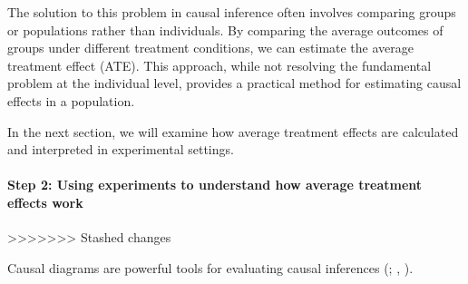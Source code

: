 \documentclass[
  singlecolumn]{article}
\let\oldparagraph\paragraph
\renewcommand{\paragraph}[1]{\oldparagraph{#1}\mbox{}}
\begin{document}
The solution to this problem in causal inference often involves
comparing groups or populations rather than individuals. By comparing
the average outcomes of groups under different treatment conditions, we
can estimate the average treatment effect (ATE). This approach, while
not resolving the fundamental problem at the individual level, provides
a practical method for estimating causal effects in a population.

In the next section, we will examine how average treatment effects are
calculated and interpreted in experimental settings.

\paragraph{Step 2: Using experiments to understand how average treatment
effects
work}\label{step-2-using-experiments-to-understand-how-average-treatment-effects-work}
>>>>>>> Stashed changes

Causal diagrams are powerful tools for evaluating causal inferences
(;
, ).
\end{document}
